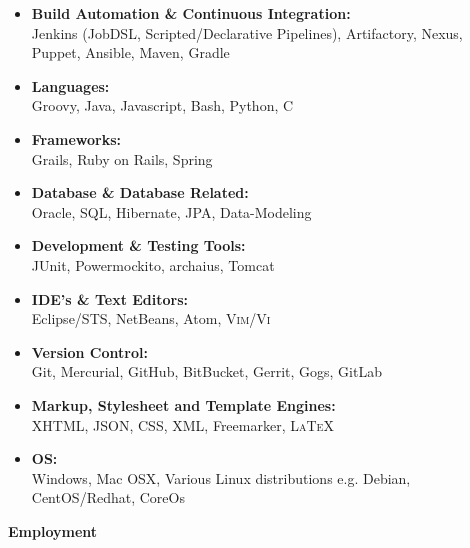 \documentclass[a4paper,12pt,final,sans]{memoir}
\begin{document}
\begin{itemize}[-]
	\item	{\textbf{\color{module} Build Automation \& Continuous Integration:} \\[-0.2em]
	Jenkins (JobDSL, Scripted/Declarative Pipelines), Artifactory, Nexus, Puppet, Ansible,
	Maven, Gradle}

	\item	{\textbf{\color{module} Languages:} \\[-0.2em]
	Groovy, Java, Javascript, Bash, Python, \textsc{C} }

	\item	{\textbf{\color{module} Frameworks:} \\[-0.2em]
	Grails, Ruby on Rails, Spring}

	\item	{\textbf{\color{module} Database \& Database Related:} \\[-0.2em]
	Oracle, \textsc{SQL}, Hibernate, JPA, Data-Modeling}

	\item	{\textbf{\color{module} Development \& Testing Tools:} \\[-0.2em]
	JUnit, Powermockito, archaius, Tomcat}

	\item	{\textbf{\color{module} IDE's \& Text Editors:} \\[-0.2em]
	Eclipse/\textsc{STS}, NetBeans, Atom, \textsc{Vim/Vi}}

	\item	{\textbf{\color{module} Version Control:} \\[-0.2em]
	Git, Mercurial, GitHub, BitBucket, Gerrit, Gogs, GitLab}

	\item	{\textbf{\color{module} Markup, Stylesheet and Template Engines:} \\[-0.2em]
	\textsc{XHTML}, \textsc{JSON}, \textsc{CSS}, \textsc{XML}, Freemarker, {\textsc{LaTeX}}}

	\item	{\textbf{\color{module} \textsc{OS}:} \\[-0.2em]
	Windows, Mac OSX, Various Linux distributions e.g. Debian, CentOS/Redhat, CoreOs}
\end{itemize}

\vskip1mm

\textbf{\textsf{\color{head} \large{Employment}}} \\[-0.8em]
\end{document}
